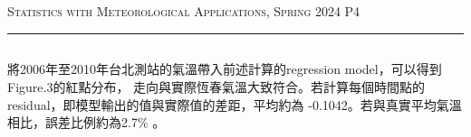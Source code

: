 \documentclass{article}
\begin{document}
\begin{CJK*}{UTF8}{bsmi}
\begin{spacing}{2.5}
\begin{large}
        \subsection*{}

    \end{large}
\end{spacing}

\newpage
\thispagestyle{empty}
\hfill {\scshape \large Statistics with Meteorological Applications, Spring 2024} \hfill {\scshape P4}
\smallskip
\hrule
\bigskip
\bigskip
\bigskip

\subsection*{}
\begin{spacing}{2.5}
    \begin{large}
        將2006年至2010年台北測站的氣溫帶入前述計算的regression model，可以得到Figure.3的紅點分布，
        走向與實際恆春氣溫大致符合。若計算每個時間點的residual，即模型輸出的值與實際值的差距，平均約為
        -0.1042。若與真實平均氣溫相比，誤差比例約為2.7\% 。
    \end{large}
\end{spacing}

\end{CJK*}
\end{document}

